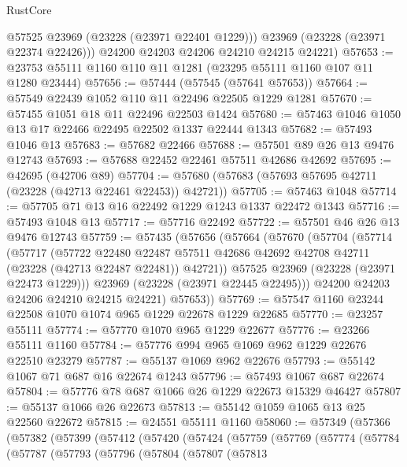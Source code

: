 \begin{lexlean}{RustCore}
\begin{coremodule}
          @57525
          @23969
          (@23228 (@23971 @22401 @1229)))
        @23969
        (@23228 (@23971 @22374 @22426)))
      @24200
      @24203
      @24206
      @24210
      @24215
      @24221)
@57653 := @23753 @55111 @1160 @110 @11 @1281 (@23295 @55111 @1160 @107 @11 @1280 @23444)
@57656 := @57444 (@57545 (@57641 @57653))
@57664 := @57549 @22439 @1052 @110 @11 @22496 @22505 @1229 @1281
@57670 := @57455 @1051 @18 @11 @22496 @22503 @1424
@57680 := @57463 @1046 @1050 @13 @17 @22466 @22495 @22502 @1337 @22444 @1343
@57682 := @57493 @1046 @13
@57683 := @57682 @22466
@57688 := @57501 @89 @26 @13 @9476 @12743
@57693 := @57688 @22452 @22461 @57511 @42686 @42692
@57695 := @42695 (@42706 @89)
@57704 := @57680 (@57683 (@57693 @57695 @42711 (@23228 (@42713 @22461 @22453)) @42721))
@57705 := @57463 @1048
@57714 := @57705 @71 @13 @16 @22492 @1229 @1243 @1337 @22472 @1343
@57716 := @57493 @1048 @13
@57717 := @57716 @22492
@57722 := @57501 @46 @26 @13 @9476 @12743
@57759 := @57435
    (@57656
      (@57664
        (@57670
          (@57704
            (@57714
              (@57717
                (@57722
                  @22480
                  @22487
                  @57511
                  @42686
                  @42692
                  @42708
                  @42711
                  (@23228 (@42713 @22487 @22481))
                  @42721))
              @57525
              @23969
              (@23228 (@23971 @22473 @1229)))
            @23969
            (@23228 (@23971 @22445 @22495)))
          @24200
          @24203
          @24206
          @24210
          @24215
          @24221)
        @57653))
@57769 := @57547 @1160 @23244 @22508 @1070 @1074 @965 @1229 @22678 @1229 @22685
@57770 := @23257 @55111
@57774 := @57770 @1070 @965 @1229 @22677
@57776 := @23266 @55111 @1160
@57784 := @57776 @994 @965 @1069 @962 @1229 @22676 @22510 @23279
@57787 := @55137 @1069 @962 @22676
@57793 := @55142 @1067 @71 @687 @16 @22674 @1243
@57796 := @57493 @1067 @687 @22674
@57804 := @57776 @78 @687 @1066 @26 @1229 @22673 @15329 @46427
@57807 := @55137 @1066 @26 @22673
@57813 := @55142 @1059 @1065 @13 @25 @22560 @22672
@57815 := @24551 @55111 @1160
@58060 := @57349
    (@57366
      (@57382
        (@57399
          (@57412
            (@57420
              (@57424
                (@57759
                  (@57769
                    (@57774
                      (@57784
                        (@57787
                          (@57793
                            (@57796
                              (@57804
                                (@57807
                                  (@57813

\end{coremodule}
\end{lexlean}
